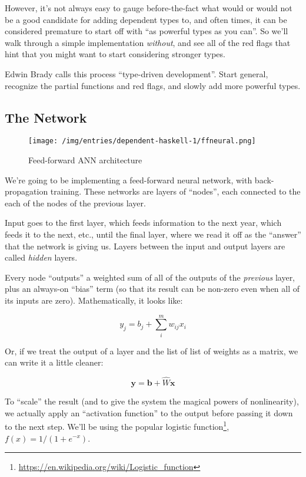 \documentclass[]{article}
\renewcommand{\href}[2]{#2\footnote{\url{#1}}}
\begin{document}
However, it's not always easy to gauge before-the-fact what would or
would not be a good candidate for adding dependent types to, and often
times, it can be considered premature to start off with ``as powerful
types as you can''. So we'll walk through a simple implementation
\emph{without}, and see all of the red flags that hint that you might
want to start considering stronger types.

Edwin Brady calls this process ``type-driven development''. Start
general, recognize the partial functions and red flags, and slowly add
more powerful types.

\subsection{The Network}\label{the-network}

\begin{figure}[htbp]
\centering
\texttt{[image: /img/entries/dependent-haskell-1/ffneural.png]}
\caption{Feed-forward ANN architecture}
\end{figure}

We're going to be implementing a feed-forward neural network, with
back-propagation training. These networks are layers of ``nodes'', each
connected to the each of the nodes of the previous layer.

Input goes to the first layer, which feeds information to the next year,
which feeds it to the next, etc., until the final layer, where we read
it off as the ``answer'' that the network is giving us. Layers between
the input and output layers are called \emph{hidden} layers.

Every node ``outputs'' a weighted sum of all of the outputs of the
\emph{previous} layer, plus an always-on ``bias'' term (so that its
result can be non-zero even when all of its inputs are zero).
Mathematically, it looks like:

\[
y_j = b_j + \sum_i^m w_{ij} x_i
\]

Or, if we treat the output of a layer and the list of list of weights as
a matrix, we can write it a little cleaner:

\[
\mathbf{y} = \mathbf{b} + \hat{W} \mathbf{x}
\]

To ``scale'' the result (and to give the system the magical powers of
nonlinearity), we actually apply an ``activation function'' to the
output before passing it down to the next step. We'll be using the
popular \href{https://en.wikipedia.org/wiki/Logistic_function}{logistic
function}, \(f(x) = 1 / (1 + e^{-x})\).
\end{document}
